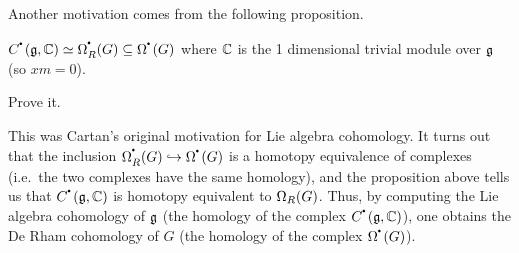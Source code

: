  Another motivation comes from the following proposition.
 \begin{proposition}
   $C^\udot (\g,\CC) \simeq \W^\udot_R(G) \subseteq \W^\udot(G)$ where $\mathbb{C}$ is the
   1 dimensional trivial module over $\mathfrak{g}$ (so $xm=0$).
 \end{proposition}
 \begin{exercise}
   Prove it.
 \end{exercise}
 \begin{remark}
   This was Cartan's original motivation for Lie algebra cohomology. It turns out that
   the inclusion $\W^\udot_R(G)\hookrightarrow \W^\udot(G)$ is a homotopy equivalence
   of complexes (i.e.\ the two complexes have the same homology), and the proposition
   above tells us that $C^\udot(\g,\CC)$ is homotopy equivalent to $\Omega_R(G)$. Thus, by
   computing the Lie algebra cohomology of $\mathfrak{g}$ (the homology of the complex
   $C^\udot(\g,\CC)$), one obtains the De Rham cohomology of $G$ (the homology of the
   complex $\W^\udot(G)$).
 \end{remark}

